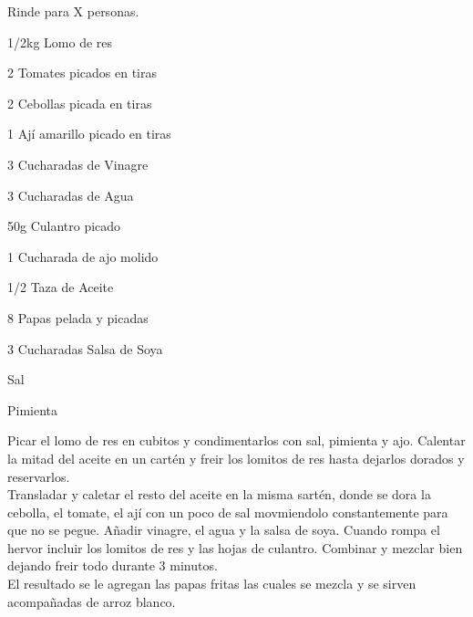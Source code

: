 
Rinde para X personas.\\

\begin{ingredientes}
\item 1/2kg Lomo de res
\item 2 Tomates picados en tiras
\item 2 Cebollas picada en tiras
\item 1 Ají amarillo picado en tiras
\item 3 Cucharadas de Vinagre
\item 3 Cucharadas de Agua
\item 50g Culantro picado
\item 1 Cucharada de ajo molido
\item 1/2 Taza de Aceite
\item 8 Papas pelada y picadas
\item 3 Cucharadas Salsa de Soya
\item Sal
\item Pimienta
\end{ingredientes}
\preparacion
Picar el lomo de res en cubitos y condimentarlos con sal, pimienta y ajo. Calentar la mitad del aceite en un cartén y freir los lomitos de res hasta dejarlos dorados y reservarlos.\\

Transladar y caletar el resto del aceite en la misma sartén, donde se dora la cebolla, el tomate, el ají con un poco de sal movmiendolo constantemente para que no se pegue. Añadir vinagre, el agua y la salsa de soya. Cuando rompa el hervor incluir los lomitos de res y las hojas de culantro. Combinar y mezclar bien dejando freir todo durante 3 minutos.\\

El resultado se le agregan las papas fritas las cuales se mezcla y se sirven acompañadas de arroz blanco.